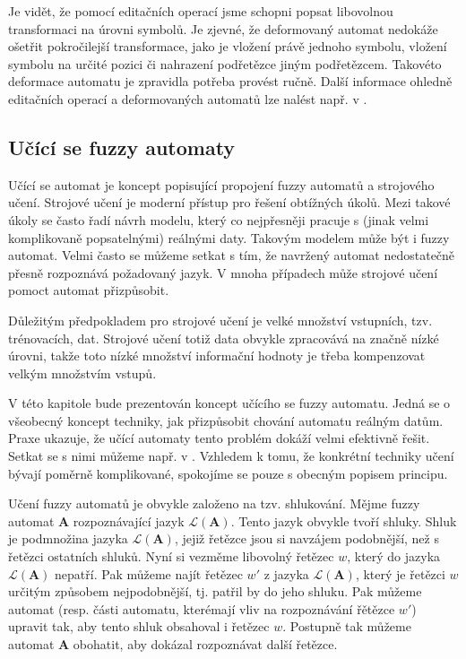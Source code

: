 Je vidět, že pomocí editačních operací jsme schopni popsat libovolnou transformaci na úrovni symbolů. Je zjevné, že deformovaný automat nedokáže ošetřit pokročilejší transformace, jako je vložení právě jednoho symbolu, vložení symbolu na určité pozici či nahrazení podřetězce jiným podřetězcem. Takovéto deformace automatu je zpravidla potřeba provést ručně. Další informace ohledně editačních operací a deformovaných automatů lze nalést např. v \cite{Ast+-FuzzAutEpsMovCmpFuzzMeasBtwStrs}.

\subsection{Učící se fuzzy automaty}
Učící se automat je koncept popisující propojení fuzzy automatů a strojového učení. Strojové učení je moderní přístup pro řešení obtížných úkolů. Mezi takové úkoly se často řadí návrh modelu, který co nejpřesněji pracuje s (jinak velmi komplikovaně popsatelnými) reálnými daty. Takovým modelem může být i fuzzy automat. Velmi často se můžeme setkat s tím, že navržený automat nedostatečně přesně rozpoznává požadovaný jazyk. V mnoha případech může strojové učení pomoct automat přizpůsobit.

Důležitým předpokladem pro strojové učení je velké množství vstupních, tzv. trénovacích, dat. Strojové učení totiž data obvykle zpracovává na značně nízké úrovni, takže toto nízké množství informační hodnoty je třeba kompenzovat velkým množstvím vstupů.

V této kapitole bude prezentován koncept učícího se fuzzy automatu. Jedná se o všeobecný koncept techniky, jak přizpůsobit chování automatu reálným datům. Praxe ukazuje, že učící automaty tento problém dokáží velmi efektivně řešit. Setkat se s nimi můžeme např. v \cite{FuLi-ForLeaAutAutGam, WeeFu-FormFuzAutAppModLeaSys, GilOmlTho-EquKnoRep+, TzaRig-StaAnaAdaFuzzConSysUsiPetrNetLeaAut, PatMor-EdgDetTecFuzzLogCEllLeaAutFuzzImPro, MarMeySol-HybMetGasDifModFuzCelAutImSha, SinGha+HybrEdgDetMetFuzSetTheCelLeaAut, AstGariGonVillFar-ApprStrMatUsiDefFuzzAutLearExpr, ZhiMinLan-EvoStraIndFuFiStaAu}. Vzhledem k tomu, že konkrétní techniky učení bývají poměrně komplikované, spokojíme se pouze s obecným popisem principu.

Učení fuzzy automatů je obvykle založeno na tzv. shlukování. Mějme fuzzy automat $\mathbf{A}$ rozpoznávající jazyk  $\mathcal{L}(\mathbf{A})$. Tento jazyk obvykle tvoří shluky. Shluk je podmnožina jazyka $\mathcal{L}(\mathbf{A})$, jejiž řetězce jsou si navzájem podobnější, než s řetězci ostatních shluků. Nyní si vezměme libovolný řetězec $w$, který do jazyka $\mathcal{L}(\mathbf{A})$ nepatří. Pak můžeme najít řetězec $w'$ z jazyka $\mathcal{L}(\mathbf{A})$, který je řetězci $w$ určitým způsobem nejpodobnější, tj. patřil by do jeho shluku. Pak můžeme automat (resp. části automatu, kterémají vliv na rozpoznávání řětězce $w'$) upravit tak, aby tento shluk obsahoval i řetězec $w$. Postupně tak můžeme automat $\mathbf{A}$ obohatit, aby dokázal rozpoznávat další řetězce.

